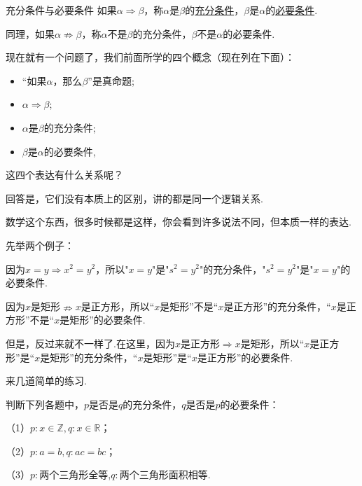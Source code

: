\documentclass[lang=cn,math=cm,chinesefont=nofont,11pt,scheme=chinese,twocol]{elegantbook}
\begin{document}
\begin{definition}{充分条件与必要条件}
  如果$\alpha\Rightarrow\beta$，称$\alpha$是$\beta$的\underline{充分条件}，$\beta$是$\alpha$的\underline{必要条件}.

  同理，如果$\alpha\nRightarrow\beta$，称$\alpha$不是$\beta$的充分条件，$\beta$不是$\alpha$的必要条件.
\end{definition}

现在就有一个问题了，我们前面所学的四个概念（现在列在下面）：
\begin{itemize}
  \item “如果$\alpha$，那么$\beta$”是真命题;
  \item $\alpha\Rightarrow\beta$;
  \item $\alpha$是$\beta$的充分条件;
  \item $\beta$是$\alpha$的必要条件,
\end{itemize}

这四个表达有什么关系呢？

回答是，它们没有本质上的区别，讲的都是同一个逻辑关系.

数学这个东西，很多时候都是这样，你会看到许多说法不同，但本质一样的表达.

\hspace*{\fill}

先举两个例子：

\begin{example}\label{202406262001}
  因为$x=y\Rightarrow x^2=y^2$，所以"$x=y$"是"$s^2=y^2$"的充分条件，"$s^2=y^2$"是"$x=y$"的必要条件.
\end{example}

\begin{example}\label{202406262002}
  因为$x$是矩形$\nRightarrow x$是正方形，所以“$x$是矩形”不是“$x$是正方形”的充分条件，“$x$是正方形”不是“$x$是矩形”的必要条件.

  但是，反过来就不一样了.在这里，因为$x$是正方形$\Rightarrow x$是矩形，所以“$x$是正方形”是“$x$是矩形”的充分条件，“$x$是矩形”是“$x$是正方形”的必要条件.
\end{example}

来几道简单的练习.

\begin{exercise}\label{202406262010}
  判断下列各题中，$p$是否是$q$的充分条件，$q$是否是$p$的必要条件：

  （1）$p:x\in\mathbb{Z},q:x\in\mathbb{R}$；

  （2）$p:a=b,q:ac=bc$；

  （3）$p:$两个三角形全等,$q:$两个三角形面积相等.
\end{exercise}
\end{document}
